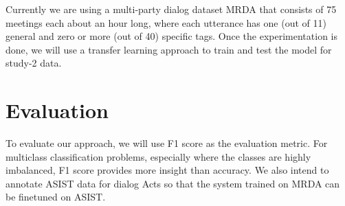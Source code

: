 Currently we are using a multi-party dialog dataset MRDA
\citep{Shriberg.ea:2004} that consists of 75 meetings each about an hour long,
where each utterance has one (out of 11) general and zero or more (out of 40)
specific tags. Once the experimentation is done, we will use a transfer
learning approach to train and test the model for study-2 data. 

\section{Evaluation}

To evaluate our approach, we will use F1 score as the evaluation metric. For
multiclass classification problems, especially where the classes are highly
imbalanced, F1 score provides more insight than accuracy.  We also intend to
annotate ASIST data for dialog Acts so that the system trained on MRDA can be
finetuned on ASIST.
